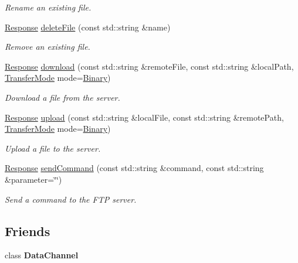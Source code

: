 \begin{DoxyCompactItemize}
\begin{DoxyCompactList}\small\item\em Rename an existing file. \end{DoxyCompactList}\item 
\hyperlink{classsf_1_1_ftp_1_1_response}{Response} \hyperlink{classsf_1_1_ftp_a8aa272b0eb7769a850006e70fcad370f}{delete\+File} (const std\+::string \&name)
\begin{DoxyCompactList}\small\item\em Remove an existing file. \end{DoxyCompactList}\item 
\hyperlink{classsf_1_1_ftp_1_1_response}{Response} \hyperlink{classsf_1_1_ftp_a20c1600ec5fd6f5a2ad1429ab8aa5df4}{download} (const std\+::string \&remote\+File, const std\+::string \&local\+Path, \hyperlink{classsf_1_1_ftp_a1cd6b89ad23253f6d97e6d4ca4d558cb}{Transfer\+Mode} mode=\hyperlink{classsf_1_1_ftp_a1cd6b89ad23253f6d97e6d4ca4d558cba6f253b362639fb5e059dc292762a21ee}{Binary})
\begin{DoxyCompactList}\small\item\em Download a file from the server. \end{DoxyCompactList}\item 
\hyperlink{classsf_1_1_ftp_1_1_response}{Response} \hyperlink{classsf_1_1_ftp_a46d6e15cddd719288b5a08b685e11765}{upload} (const std\+::string \&local\+File, const std\+::string \&remote\+Path, \hyperlink{classsf_1_1_ftp_a1cd6b89ad23253f6d97e6d4ca4d558cb}{Transfer\+Mode} mode=\hyperlink{classsf_1_1_ftp_a1cd6b89ad23253f6d97e6d4ca4d558cba6f253b362639fb5e059dc292762a21ee}{Binary})
\begin{DoxyCompactList}\small\item\em Upload a file to the server. \end{DoxyCompactList}\item 
\hyperlink{classsf_1_1_ftp_1_1_response}{Response} \hyperlink{classsf_1_1_ftp_a44e095103ecbce175a33eaf0820440ff}{send\+Command} (const std\+::string \&command, const std\+::string \&parameter=\char`\"{}\char`\"{})
\begin{DoxyCompactList}\small\item\em Send a command to the F\+TP server. \end{DoxyCompactList}\end{DoxyCompactItemize}
\subsection*{Friends}
\begin{DoxyCompactItemize}
\item 
\mbox{\label{classsf_1_1_ftp_a8dee57337b6a7e183bfe21d178757b0c}} 
class {\bfseries Data\+Channel}
\end{DoxyCompactItemize}


